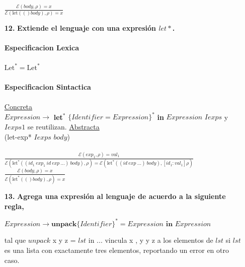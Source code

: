 \documentclass{article}
\begin{document}
\begin{itemize}
    \hspace*{10mm}
        $\frac
        {\mathcal{E}(body,\rho)=x}
        {\mathcal{E}(\text{let}(() body),\rho)=x}$
    \\
    \item[\textbf{12.}] \textbf{{\Large Extiende el lenguaje con una expresión $let*$.}}\\
    \\
    \textbf{Especificacion Lexica}\\
    \\
    \hspace*{10mm} $\text{Let}^*=\text{Let}^*$\\
    \\
    \textbf{Especificacion Sintactica}\\
    \\
    \hspace*{10mm} \underline{Concreta}\\
    \hspace*{10mm} $Expression\rightarrow$ \textbf{let}$^*$ $\{ Identifier = Expression \}^*$ \textbf{in} $Expression$
    \hspace*{10mm} $Iexps$ y $Iexps1$ se reutilizan.
    \newpage
    \hspace*{10mm} \underline{Abstracta}\\
    \hspace*{10mm} (let-exp* $Iexps$ $body$)\\
    \\
    \hspace*{10mm}
        $\frac
        {\mathcal{E}(exp_1,\rho)=val_1}
        {\mathcal{E}(\text{let}^*((id_1\ exp_1\ id\ exp\ ...)\ body),\rho)=\mathcal{E}(\text{let}^*((id\ exp\ ...)\ body), [id_1 : val_1]\rho)}$
    \hspace*{10mm}
        $\frac
        {\mathcal{E}(body,\rho)=x}
        {\mathcal{E}(\text{let}^*(() body),\rho)=x}$
    \\
    \item[\textbf{13.}] \textbf{{\Large Agrega una expresión al lenguaje de acuerdo a la siguiente regla,}}
    \begin{center}
        $Expression\rightarrow\textbf{unpack}\{ Identifier \}^*=Expression\textbf{ in }Expression$
    \end{center}
    tal que $unpack$ x y z = $lst$ in ... vincula x , y y z a los elementos de $lst$ si $lst$ es una lista con exactamente tres elementos, reportando un error en otro caso.\\

\end{itemize}
\end{document}
